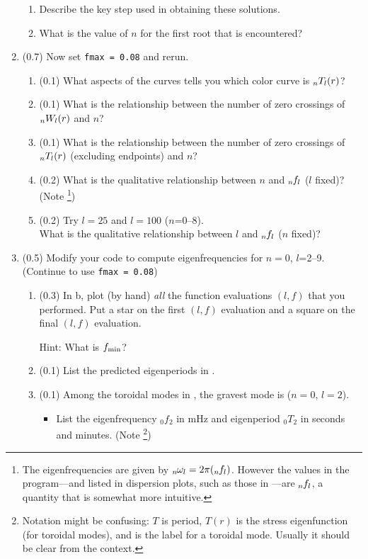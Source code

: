 \documentclass[11pt,titlepage,fleqn]{article}
\begin{document}
\begin{enumerate}
\begin{enumerate}
\item Describe the key step used in obtaining these solutions.

\item What is the value of $n$ for the first root that is encountered?

\end{enumerate}


\item (0.7) Now set \verb+fmax = 0.08+ and rerun.
%
\begin{enumerate}
\item (0.1) What aspects of the curves tells you which color curve is $\mbox{${}_nT_l$}(r)$?
\item (0.1) What is the relationship between the number of zero crossings of $\mbox{${}_nW_l$}(r)$ and $n$?
\item (0.1) What is the relationship between the number of zero crossings of $\mbox{${}_nT_l$}(r)$ (excluding endpoints) and $n$?
\item (0.2) What is the qualitative relationship between $n$ and $\mbox{${}_{n\hspace{-0.2 mm}}f_l$}$ ($l$ fixed)? (Note \footnote{The eigenfrequencies are given by $\mbox{${}_{n\hspace{-0.2 mm}}\omega_l$} = 2\pi(\mbox{${}_{n\hspace{-0.2 mm}}f_l$})$. However the values in the program---and listed in dispersion plots, such as those in \citet{SteinWysession}---are $\mbox{${}_{n\hspace{-0.2 mm}}f_l$}$, a quantity that is somewhat more intuitive.})
\item (0.2) Try $l=25$ and $l=100$ ($n$=0--8). \\
What is the qualitative relationship between $l$ and $\mbox{${}_{n\hspace{-0.2 mm}}f_l$}$ ($n$ fixed)?
\end{enumerate}


\item (0.5) Modify your code to compute eigenfrequencies for $n=0$, $l$=2--9. (Continue to use \verb+fmax = 0.08+)
%
\begin{enumerate}
\item (0.3) In b, plot (by hand) {\em all} the function evaluations $(l, f)$ that you performed. Put a star on the first $(l,f)$ evaluation and a square on the final $(l,f)$ evaluation.

Hint: What is $f_{\rm min}$?

\item (0.1) List the predicted eigenperiods in .

\item (0.1) Among the toroidal modes in , the gravest mode is  ($n=0$, $l=2$).
%
\begin{itemize}
\item List the eigenfrequency $_0f_2$ in mHz and eigenperiod $_0T_2$ in seconds and minutes. (Note \footnote{Notation might be confusing: $T$ is period, $T(r)$ is the stress eigenfunction (for toroidal modes), and  is the label for a toroidal mode. Usually it should be clear from the context.})


\end{itemize}
\end{enumerate}
\end{enumerate}
\end{document}
